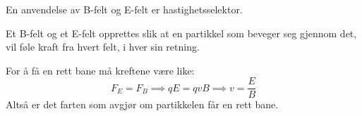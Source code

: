 En anvendelse av B-felt og E-felt er hastighetsselektor.

Et B-felt og et E-felt opprettes slik at en partikkel som beveger seg
gjennom det, vil føle kraft fra hvert felt, i hver sin retning.

For å få en rett bane må kreftene være like:
$$F_E = F_B
  \implies qE = qvB
  \implies v = \frac{E}{B}$$
Altså er det farten som avgjør om partikkelen får en rett bane.
